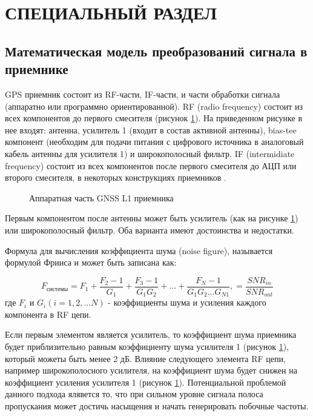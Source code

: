 \section{СПЕЦИАЛЬНЫЙ РАЗДЕЛ}

\subsection{Математическая модель преобразований сигнала в приемнике}
GPS приемник состоит из RF-части, IF-части, и части обработки сигнала (аппаратно или программно ориентированной). RF (radio frequency)
состоит из всех компонентов до первого смесителя (рисунок \ref{pic:hw_receiver}). На приведенном рисунке в нее входят: антенна,
усилитель 1 (входит в состав активной антенны), bias-tee компонент (необходим для подачи питания с цифрового источника в аналоговый
кабель антенны для усилителя 1) и широкополосный фильтр. IF (intermidiate frequency) состоит из всех компонентов после первого
смесителя до АЦП или второго смесителя, в некоторых конструкциях приемников \cite{gps}.

\begin{figure}[H]
\begin{center}
\end{center}
\caption{Аппаратная часть GNSS L1 приемника}
\label{pic:hw_receiver}
\end{figure}

Первым компонентом после антенны может быть усилитель (как на рисунке \ref{pic:hw_receiver}) или широкополосный фильтр. Оба
варианта имеют достоинства и недостатки.

Формула для вычисления коэффициента шума (noise figure), называется формулой Фрииса \cite{boyd} и может быть записана как:

\begin{equation}
F_{\mbox{системы}} = 
			F_1 + \frac{F_2 - 1}{G_1} + \frac{F_3 - 1}{G_1 G_2} + ... + \frac{F_N - 1}{G_1 G_2 ... G_{N1}},
		   =
			\frac{SNR_{in}}{SNR_{out}}
\label{eq:friis}
\end{equation}
где ${F_i}$ и ${G_i (i=1,2,...N)}$ - коэффициенты шума и усиления каждого компонента в RF цепи.

Если первым элементом является усилитель, то коэффициент шума приемника будет приблизительно равным коэффициенту шума
усилителя 1 (рисунок \ref{pic:hw_receiver}), который можеты быть менее 2 дБ. Влияние следующего элемента RF цепи, например 
широкополосного усилителя, на коэффициент шума будет снижен на коэффициент усиления усилителя 1 (рисунок \ref{pic:hw_receiver}).
Потенциальной проблемой данного подхода ялявется то, что при сильном уровне сигнала полоса пропускания может достичь насыщения
и начать генерировать побочные частоты.

